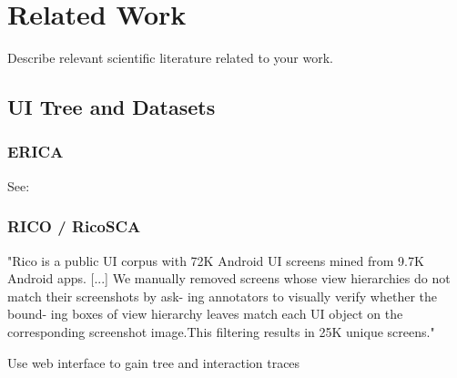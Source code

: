 \chapter{Related Work}

Describe relevant scientific literature related to your work.

\section{UI Tree and Datasets}

\subsection{ERICA}

See: \cite{deka2016erica}

\subsection{RICO / RicoSCA}

"Rico is a public UI corpus with 72K Android UI
screens mined from 9.7K Android apps. [...]
We manually removed screens whose view
hierarchies do not match their screenshots by ask-
ing annotators to visually verify whether the bound-
ing boxes of view hierarchy leaves match each UI
object on the corresponding screenshot image.This filtering results in 25K unique screens."



Use web interface to gain tree and interaction traces


